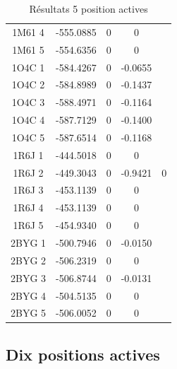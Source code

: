 \documentclass[a4paper,12pt]{article}
\begin{document}
\begin{table}[h]
\begin{tabular}{|c|c|c|c|c|}
        1M61 4 & -555.0885 & 0 & 0 &  \\
        1M61 5 & -554.6356 & 0 & 0 &  \\
        1O4C 1 & -584.4267 & 0 & -0.0655 &  \\
        1O4C 2 & -584.8989 & 0 & -0.1437 &  \\
        1O4C 3 & -588.4971 & 0 & -0.1164 &  \\
        1O4C 4 & -587.7129 & 0 & -0.1400 &  \\
        1O4C 5 & -587.6514 & 0 & -0.1168 &  \\
        1R6J 1 & -444.5018 & 0 & 0 &  \\
        1R6J 2 & -449.3043 & 0 & -0.9421 & 0 \\
        1R6J 3 & -453.1139 & 0 & 0 &  \\
        1R6J 4 & -453.1139 & 0 & 0 &  \\
        1R6J 5 & -454.9340 & 0 & 0 &  \\
        2BYG 1 & -500.7946 & 0 & -0.0150 &  \\
        2BYG 2 & -506.2319 & 0 & 0 &  \\
        2BYG 3 & -506.8744 & 0 & -0.0131 &  \\
        2BYG 4 & -504.5135 & 0 & 0 &  \\
        2BYG 5 & -506.0052 & 0 & 0 &  \\

        \hline




 \end{tabular}      
 \caption{Résultats 5 position actives}
 \label{tab_echec2BYG__1}      
\end{table}


   \subsection{ Dix positions actives}
\end{document}
